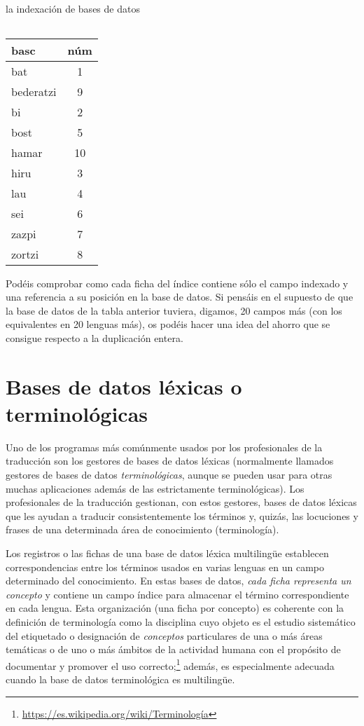 \begin{persabermes}{la indexación de bases de datos}
\begin{center}
{\begin{tabular}{lc}
\end{tabular}} \hspace{0.2\textwidth} \parbox{0.25\textwidth}{ \begin{tabular}{lc} \hline

{\sc basc\phantom{o-croat}} &{\sc núm} \\ \hline

\hline

bat &1 \\ bederatzi &9 \\ bi &2 \\ bost &5 \\ hamar &10 \\ hiru &3 \\ lau &4 \\ sei &6 \\ zazpi &7 \\ zortzi &8 \\ \hline

\end{tabular}} \end{center} Podéis comprobar como cada ficha del índice contiene sólo el campo indexado y una referencia a su posición en la base de datos. Si pensáis en el supuesto de que la base de datos de la tabla anterior tuviera, digamos, 20 campos más (con los equivalentes en 20 lenguas más), os podéis hacer una idea del ahorro que se consigue respecto a la duplicación entera. \end{persabermes} 

%
\section{Bases de datos léxicas o terminológicas} \label{ss:bdterm} 

Uno de los programas más comúnmente usados por los profesionales de la traducción son los gestores de bases de datos léxicas (normalmente llamados gestores de bases de datos \emph{terminológicas}, aunque se pueden usar para otras muchas aplicaciones además de las estrictamente terminológicas). Los profesionales de la traducción gestionan, con estos gestores, bases de datos léxicas que les ayudan a traducir consistentemente los términos y, quizás, las locuciones y frases de una determinada área de conocimiento (terminología). 

Los registros o las fichas de una base de datos léxica multilingüe establecen correspondencias entre los términos usados en varias lenguas en un campo determinado del conocimiento. En estas bases de datos, \emph{cada ficha representa un concepto} y contiene un campo índice para almacenar el término correspondiente en cada lengua. Esta organización (una ficha por concepto) es coherente con la definición de terminología como la disciplina cuyo objeto es el estudio sistemático del etiquetado o designación de \emph{conceptos} particulares de una o más áreas temáticas o de uno o más ámbitos de la actividad humana con el propósito de documentar y promover el uso correcto;\footnote{\url{https://es.wikipedia.org/wiki/Terminología}} además, es especialmente adecuada cuando la base de datos terminológica es multilingüe. 


